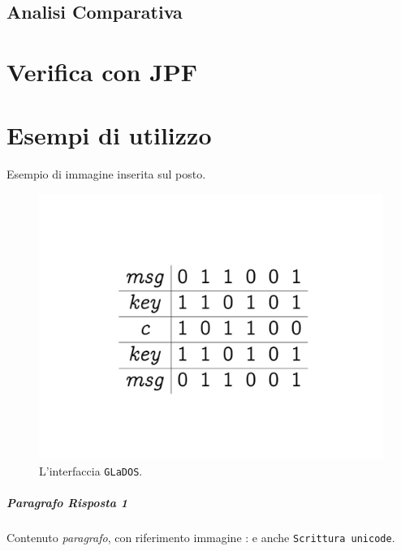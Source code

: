 \documentclass[a4paper,12pt]{report}
\begin{document}
\section{Analisi Comparativa}


\chapter{Verifica con JPF}

\chapter{Esempi di utilizzo}
Esempio di immagine inserita sul posto.
\begin{figure}[h]
\centering{}
\includegraphics[width=\textwidth]{img/example_img.pdf}
\caption{L'interfaccia \texttt{GLaDOS}.}
\label{img:example}
\end{figure}

\paragraph{Paragrafo Risposta 1} Contenuto \textit{paragrafo}, con riferimento immagine
: e anche \texttt{Scrittura unicode}.
\end{document}
